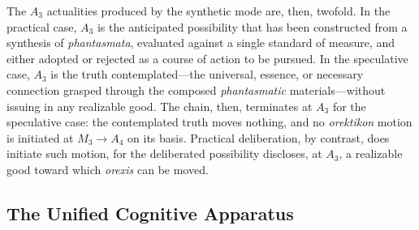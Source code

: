 \documentclass{article}
\begin{document}
The $A_3$ actualities produced by the synthetic mode are, then, twofold. In the practical case, $A_3$ is the anticipated possibility that has been constructed from a synthesis of \textit{phantasmata}, evaluated against a single standard of measure, and either adopted or rejected as a course of action to be pursued. In the speculative case, $A_3$ is the truth contemplated---the universal, essence, or necessary connection grasped through the composed \textit{phantasmatic} materials---without issuing in any realizable good. The chain, then, terminates at $A_3$ for the speculative case: the contemplated truth moves nothing, and no \textit{orektikon} motion is initiated at $M_3 \to A_4$ on its basis. Practical deliberation, by contrast, does initiate such motion, for the deliberated possibility discloses, at $A_3$, a realizable good toward which \textit{orexis} can be moved.

\subsection{The Unified Cognitive Apparatus}
\end{document}
